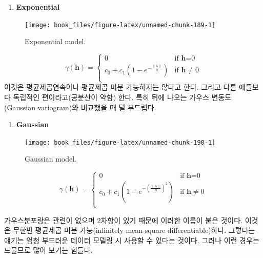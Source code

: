 \documentclass[b5paper,]{book}
\providecommand{\tightlist}{%
  \setlength{\itemsep}{0pt}\setlength{\parskip}{0pt}}
\theoremstyle{definition}
\theoremstyle{definition}
\theoremstyle{definition}
\theoremstyle{remark}
\begin{document}
\begin{enumerate}
\def\labelenumi{\arabic{enumi}.}
\setcounter{enumi}{2}
\tightlist
\item
  \textbf{Exponential}
\end{enumerate}

\begin{figure}

{\centering \texttt{[image: book\_files/figure-latex/unnamed-chunk-189-1]} 

}

\caption{Exponential model.}\label{fig:unnamed-chunk-189}
\end{figure}

\[
\gamma(\mathbf{h})= \left\{ \begin{array}{ll}
0 & \textrm{if $\mathbf{h}$=0}\\
c_{0}+c_{1}(1-e^{-\frac{\|\mathbf{h}\|}{R}}) & \textrm{if $\mathbf{h}\neq 0$}\\
\end{array} \right.
\] 이것은 평균제곱연속이나 평균제곱 미분 가능하지는 않다고 한다. 그리고
다른 애들보다 독립적인 편이라고(공분산이 약함) 한다. 특히 뒤에 나오는
가우스 변동도(Gaussian variogram)와 비교했을 때 덜 부드럽다.

\begin{enumerate}
\def\labelenumi{\arabic{enumi}.}
\setcounter{enumi}{3}
\tightlist
\item
  \textbf{Gaussian}
\end{enumerate}

\begin{figure}

{\centering \texttt{[image: book\_files/figure-latex/unnamed-chunk-190-1]} 

}

\caption{Gaussian model.}\label{fig:unnamed-chunk-190}
\end{figure}

\[
\gamma(\mathbf{h})= \left\{ \begin{array}{ll}
0 & \textrm{if $\mathbf{h}$=0}\\
c_{0}+c_{1}(1-e^{-(\frac{\|\mathbf{h}\|}{R})^{2}}) & \textrm{if $\mathbf{h}\neq 0$}\\
\end{array} \right.
\]

가우스분포랑은 관련이 없으며 2차항이 있기 때문에 이러한 이름이 붙은
것이다. 이것은 무한번 평균제곱 미분 가능(infinitely mean-square
differentiable)하다. 그렇다는 얘기는 엄청 부드러운 데이터 모델링 시
사용할 수 있다는 것이다. 그러나 이런 경우는 드물므로 많이 보기는 힘들다.
\end{document}
